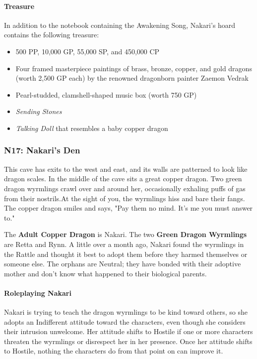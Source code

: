 \documentclass[letterpaper, 11pt, twocolumn]{dndbook}
\begin{document}
\paragraph{Treasure}

In addition to the notebook containing the Awakening Song, Nakari's hoard contains the following treasure:

\begin{itemize}
\item 500 PP, 10,000 GP, 55,000 SP, and 450,000 CP
\item Four framed masterpiece paintings of brass, bronze, copper, and gold dragons (worth 2,500 GP each) by the renowned dragonborn painter Zaemon Vedrak
\item Pearl-studded, clamshell-shaped music box (worth 750 GP)
\item \textit{Sending Stones}
\item \textit{Talking Doll} that resembles a baby copper dragon
\end{itemize}

\subsubsection{N17: Nakari's Den}

\begin{DndReadAloud}
This cave has exits to the west and east, and its walls are patterned to look like dragon scales. In the middle of the cave sits a great copper dragon. Two green dragon wyrmlings crawl over and around her, occasionally exhaling puffs of gas from their nostrils.At the sight of you, the wyrmlings hiss and bare their fangs. The copper dragon smiles and says, "Pay them no mind. It's me you must answer to."
\end{DndReadAloud}

The \textbf{Adult Copper Dragon} is Nakari. The two \textbf{Green Dragon Wyrmlings} are Retta and Rynn. A little over a month ago, Nakari found the wyrmlings in the Rattle and thought it best to adopt them before they harmed themselves or someone else. The orphans are Neutral; they have bonded with their adoptive mother and don't know what happened to their biological parents.

\paragraph{Roleplaying Nakari}

Nakari is trying to teach the dragon wyrmlings to be kind toward others, so she adopts an Indifferent attitude toward the characters, even though she considers their intrusion unwelcome. Her attitude shifts to Hostile if one or more characters threaten the wyrmlings or disrespect her in her presence. Once her attitude shifts to Hostile, nothing the characters do from that point on can improve it.
\end{document}
